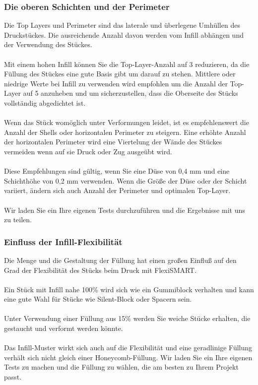 \documentclass[11pt,a4paper]{article}
\begin{document}
		\subsubsection{Die oberen Schichten und der Perimeter}
Die Top Layers und Perimeter sind das laterale und überlegene Umhüllen des Druckstückes. Die ausreichende Anzahl davon werden vom Infill abhängen und der Verwendung des Stückes.
\\\\
Mit einem hohen Infill können Sie die Top-Layer-Anzahl auf 3 reduzieren, da die Füllung des Stückes eine gute Basis gibt um darauf zu stehen. Mittlere oder niedrige Werte bei Infill zu verwenden wird empfohlen um die Anzahl der Top-Layer auf 5 anzuheben und um sicherzustellen, dass die Oberseite des Stücks vollständig abgedichtet ist.
\\\\
Wenn das Stück womöglich unter Verformungen leidet, ist es empfehlenswert die Anzahl der Shells oder horizontalen Perimeter zu steigern. Eine erhöhte Anzahl der horizontalen Perimeter wird eine Viertelung der Wände des Stückes vermeiden wenn auf sie Druck oder Zug ausgeübt wird.
\\\\
Diese Empfehlungen sind gültig, wenn Sie eine Düse von 0,4 mm und eine Schichthöhe von 0,2 mm verwenden. Wenn die Größe der Düse oder der Schicht variiert, ändern sich auch Anzahl der Perimeter und optimalen Top-Layer.
\\\\
Wir laden Sie ein Ihre eigenen Tests durchzuführen und die Ergebnisse mit uns zu teilen.
		\subsubsection{Einfluss der Infill-Flexibilität}
Die Menge und die Gestaltung der Füllung hat einen großen Einfluß auf den Grad der Flexibilität des Stücks beim Druck mit FlexiSMART.
\\\\
Ein Stück mit Infill nahe 100\% wird sich wie ein Gummiblock verhalten und kann eine gute Wahl für Stücke wie Silent-Block oder Spacern sein.
\\\\
Unter Verwendung einer Füllung aus 15\% werden Sie weiche Stücke erhalten, die gestaucht und verformt werden könnte.
\\\\
Das Infill-Muster wirkt sich auch auf die Flexibilität und eine geradlinige Füllung verhält sich nicht gleich einer Honeycomb-Füllung. Wir laden Sie ein Ihre eigenen Tests zu machen und die Füllung zu wählen, die am besten zu Ihrem Projekt passt.
\end{document}
